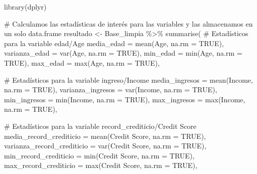 \documentclass[
  letterpaper,
  DIV=11,
  numbers=noendperiod]{scrreprt}
\newenvironment{Shaded}{\begin{snugshade}}{\end{snugshade}}
\newcommand{\AttributeTok}[1]{\textcolor[rgb]{0.40,0.45,0.13}{#1}}
\newcommand{\CommentTok}[1]{\textcolor[rgb]{0.37,0.37,0.37}{#1}}
\newcommand{\ConstantTok}[1]{\textcolor[rgb]{0.56,0.35,0.01}{#1}}
\newcommand{\FunctionTok}[1]{\textcolor[rgb]{0.28,0.35,0.67}{#1}}
\newcommand{\NormalTok}[1]{\textcolor[rgb]{0.00,0.23,0.31}{#1}}
\newcommand{\OtherTok}[1]{\textcolor[rgb]{0.00,0.23,0.31}{#1}}
\newcommand{\SpecialCharTok}[1]{\textcolor[rgb]{0.37,0.37,0.37}{#1}}
\newcommand{\StringTok}[1]{\textcolor[rgb]{0.13,0.47,0.30}{#1}}
\begin{document}
\begin{Shaded}
\begin{Highlighting}[]
\FunctionTok{library}\NormalTok{(dplyr)}

\CommentTok{\# Calculamos las estadísticas de interés para las variables y las almacenamos en un solo data.frame}
\NormalTok{resultado }\OtherTok{\textless{}{-}}\NormalTok{ Base\_limpia }\SpecialCharTok{\%\textgreater{}\%} 
  \FunctionTok{summarise}\NormalTok{(}
    \CommentTok{\# Estadísticos para la variable edad/Age}
    \AttributeTok{media\_edad =} \FunctionTok{mean}\NormalTok{(Age, }\AttributeTok{na.rm =} \ConstantTok{TRUE}\NormalTok{),}
    \AttributeTok{varianza\_edad =} \FunctionTok{var}\NormalTok{(Age, }\AttributeTok{na.rm =} \ConstantTok{TRUE}\NormalTok{),}
    \AttributeTok{min\_edad =} \FunctionTok{min}\NormalTok{(Age, }\AttributeTok{na.rm =} \ConstantTok{TRUE}\NormalTok{),}
    \AttributeTok{max\_edad =} \FunctionTok{max}\NormalTok{(Age, }\AttributeTok{na.rm =} \ConstantTok{TRUE}\NormalTok{),}
    
    \CommentTok{\# Estadísticos para la variable ingreso/Income}
    \AttributeTok{media\_ingresos =} \FunctionTok{mean}\NormalTok{(Income, }\AttributeTok{na.rm =} \ConstantTok{TRUE}\NormalTok{),}
    \AttributeTok{varianza\_ingresos =} \FunctionTok{var}\NormalTok{(Income, }\AttributeTok{na.rm =} \ConstantTok{TRUE}\NormalTok{),}
    \AttributeTok{min\_ingresos =} \FunctionTok{min}\NormalTok{(Income, }\AttributeTok{na.rm =} \ConstantTok{TRUE}\NormalTok{),}
    \AttributeTok{max\_ingresos =} \FunctionTok{max}\NormalTok{(Income, }\AttributeTok{na.rm =} \ConstantTok{TRUE}\NormalTok{),}
    
    \CommentTok{\# Estadísticos para la variable record\_crediticio/Credit Score}
    \AttributeTok{media\_record\_crediticio =} \FunctionTok{mean}\NormalTok{(}\StringTok{\textasciigrave{}}\AttributeTok{Credit Score}\StringTok{\textasciigrave{}}\NormalTok{, }\AttributeTok{na.rm =} \ConstantTok{TRUE}\NormalTok{),}
    \AttributeTok{varianza\_record\_crediticio =} \FunctionTok{var}\NormalTok{(}\StringTok{\textasciigrave{}}\AttributeTok{Credit Score}\StringTok{\textasciigrave{}}\NormalTok{, }\AttributeTok{na.rm =} \ConstantTok{TRUE}\NormalTok{),}
    \AttributeTok{min\_record\_crediticio =} \FunctionTok{min}\NormalTok{(}\StringTok{\textasciigrave{}}\AttributeTok{Credit Score}\StringTok{\textasciigrave{}}\NormalTok{, }\AttributeTok{na.rm =} \ConstantTok{TRUE}\NormalTok{),}
    \AttributeTok{max\_record\_crediticio =} \FunctionTok{max}\NormalTok{(}\StringTok{\textasciigrave{}}\AttributeTok{Credit Score}\StringTok{\textasciigrave{}}\NormalTok{, }\AttributeTok{na.rm =} \ConstantTok{TRUE}\NormalTok{),}
    

\end{Highlighting}
\end{Shaded}
\end{document}
